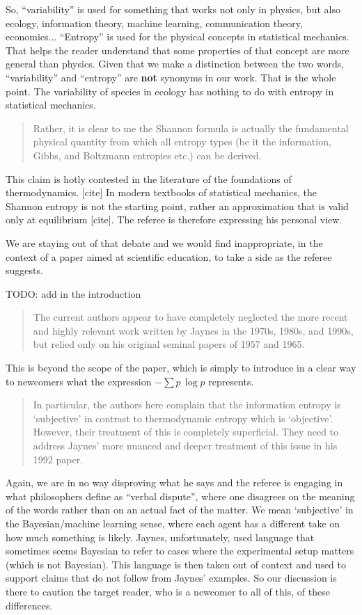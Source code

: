 \documentclass[11pt]{article}
\begin{document}
So, ``variability'' is used for something that works not only in physics, but also ecology, information theory, machine learning, communication theory, economics... ``Entropy'' is used for the physical concepts in statistical mechanics. That helps the reader understand that some properties of that concept are more general than physics. Given that we make a distinction between the two words, ``variability'' and ``entropy'' are \textbf{not} synonyms in our work. That is the whole point. The variability of species in ecology has nothing to do with entropy in statistical mechanics.

\begin{quote}
Rather, it is clear to me the Shannon formula is actually the fundamental physical quantity from which all entropy types (be it the information, Gibbs, and Boltzmann entropies etc.) can be derived.
\end{quote}
This claim is hotly contested in the literature of the foundations of thermodynamics. [cite] In modern textbooks of statistical mechanics, the Shannon entropy is not the starting point, rather an approximation that is valid only at equilibrium [cite]. The referee is therefore expressing his personal view.

We are staying out of that debate and we would find inappropriate, in the context of a paper aimed at scientific education, to take a side as the referee suggests.

TODO: add in the introduction

\begin{quote}
The current authors appear to have completely neglected the more recent and highly relevant work written by Jaynes in the 1970s, 1980s, and 1990s, but relied only on his original seminal papers of 1957 and 1965.
\end{quote}

This is beyond the scope of the paper, which is simply to introduce in a clear way to newcomers what the expression $- \sum p \, \log p$ represents.

\begin{quote}
In particular, the authors here complain that the information entropy is ‘subjective’ in contrast to thermodynamic entropy which is ‘objective’. However, their treatment of this is completely superficial. They need to address Jaynes’ more nuanced and deeper treatment of this issue in his 1992 paper.
\end{quote}
Again, we are in no way disproving what he says and the referee is engaging in what philosophers define as ``verbal dispute'', where one disagrees on the meaning of the words rather than on an actual fact of the matter. We mean `subjective' in the Bayesian/machine learning sense, where each agent has a different take on how much something is likely. Jaynes, unfortunately, used language that sometimes seems Bayesian to refer to cases where the experimental setup matters (which is not Bayesian). This language is then taken out of context and used to support claims that do not follow from Jaynes' examples. So our discussion is there to caution the target reader, who is a newcomer to all of this, of these differences.
\end{document}

